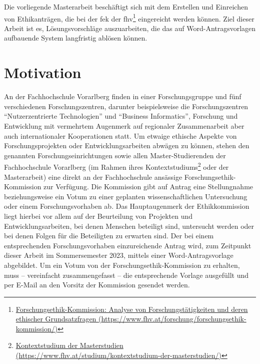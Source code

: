 \documentclass[a4paper,12pt,twoside]{scrreprt}
\begin{document}
Die vorliegende Masterarbeit beschäftigt sich mit dem Erstellen und Einreichen von Ethikanträgen, die bei der \ac{fek} der \ac{fhv}\footnote{\href{https://www.fhv.at/forschung/forschungsethik-kommission/}{Forschungsethik-Kommission: Analyse von Forschungstätigkeiten und deren ethischer Grundsatzfragen (\url{https://www.fhv.at/forschung/forschungsethik-kommission/)}}} eingereicht werden können. Ziel dieser Arbeit ist es, Lösungsvorschläge auszuarbeiten, die das auf Word-Antragsvorlagen aufbauende System langfristig ablösen können.

\section{Motivation}
\label{sec:motivation}

An der Fachhochschule Vorarlberg finden in einer Forschungsgruppe und fünf verschiedenen Forschungszentren, darunter beispielsweise die Forschungszentren \enquote{Nutzerzentrierte Technologien} und \enquote{Business Informatics}, Forschung und Entwicklung mit vermehrtem Augenmerk auf regionaler Zusammenarbeit aber auch internationaler Kooperationen statt. \cite{fachhochschule_vorarlberg_gmbh_forschung_2021} Um etwaige ethische Aspekte von Forschungsprojekten oder Entwicklungsarbeiten abwägen zu können, stehen den genannten Forschungseinrichtungen sowie allen Master-Studierenden der Fachhochschule Vorarlberg (im Rahmen ihres Kontextstudiums\footnote{\href{https://www.fhv.at/studium/kontextstudium-der-masterstudien/}{Kontextstudium der Masterstudien (\url{https://www.fhv.at/studium/kontextstudium-der-masterstudien/)}}} oder der Masterarbeit) eine direkt an der Fachhochschule ansässige Forschungsethik-Kommission zur Verfügung. Die Kommission gibt auf Antrag eine Stellungnahme beziehungsweise ein Votum zu einer geplanten wissenschaftlichen Untersuchung oder einem Forschungsvorhaben ab. Das Hauptaugenmerk der Ethikkommission liegt hierbei vor allem auf der Beurteilung von Projekten und Entwicklungsarbeiten, bei denen Menschen beteiligt sind, untersucht werden oder bei denen Folgen für die Beteiligten zu erwarten sind. Der bei einem entsprechenden Forschungsvorhaben einzureichende Antrag wird, zum Zeitpunkt dieser Arbeit im Sommersemester 2023, mittels einer Word-Antragsvorlage abgebildet. Um ein Votum von der Forschungsethik-Kommission zu erhalten, muss -- vereinfacht zusammengefasst -- die entsprechende Vorlage ausgefüllt und per E-Mail an den Vorsitz der Kommission gesendet werden. \cite{fachhochschule_vorarlberg_gmbh_forschungsethik-kommission_2021}
\end{document}
